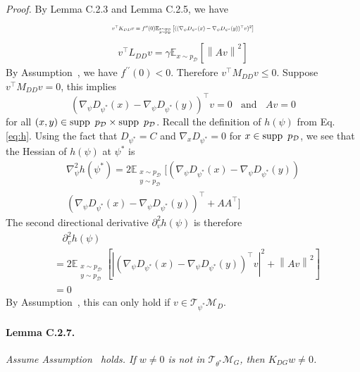 \emph{Proof.} By Lemma C.2.3 and Lemma C.2.5, we have
\begin{align}
\resizebox{0.42\textwidth}{!}{$
v^\top K_{DD}v=f^{\prime\prime}(0)\mathbb{E}_{\substack{x\sim p_\mathcal{D}\\y\sim p_\mathcal{D}}}\left[((\nabla_\psi D_{\psi^*}(x)-\nabla_\psi D_{\psi^*}(y))^\top v)^2\right]
$}
\end{align}
\begin{align}
v^\top L_{DD}v=\gamma\mathbb{E}_{x\sim p_\mathcal{D}}\left[\left\|Av\right \|^2\right]
\end{align}
By Assumption~, we have $f^{\prime\prime}(0)<0$. Therefore $v^\top M_{DD}v \leq 0$. Suppose $v^\top M_{DD}v=0$, this implies
\begin{equation}
(\nabla_\psi D_{\psi^*}(x)-\nabla_\psi D_{\psi^*}(y))^\top v=0\ \ \ \ \text{and}\ \ \ \ Av=0
\end{equation}
for all $(x,y)\in\supp\ p_\mathcal{D}\times\supp\ p_\mathcal{D}$. Recall the definition of $h(\psi)$ from Eq.\ref{eq:h}. Using the fact that $D_{\psi^*}=C$ and $\nabla_x D_{\psi^*}=0$ for $x\in\operatorname{supp}\ p_\mathcal{D}$, we see that the Hessian of $h(\psi)$ at $\psi^*$ is
\begin{align}
\nabla^2_\psi h(\psi^*)=2\mathbb{E}_{\substack{x\sim p_\mathcal{D}\\y\sim p_\mathcal{D}}}[(\nabla_\psi D_{\psi^*}(x)-\nabla_\psi D_{\psi^*}(y)) \nonumber \\
(\nabla_\psi D_{\psi^*}(x)-\nabla_\psi D_{\psi^*}(y))^\top+AA^\top]
\end{align}
The second directional derivative $\partial^2_v h(\psi)$ is therefore
\begin{align}
&\ \ \ \ \partial^2_v h(\psi) \nonumber \\
&=2\mathbb{E}_{\substack{x\sim p_\mathcal{D}\\y\sim p_\mathcal{D}}}\left[\left| (\nabla_\psi D_{\psi^*}(x)-\nabla_\psi D_{\psi^*}(y))^\top v\right|^2 + \left\|Av\right\|^2\right] \nonumber \\
&=0
\end{align}
By Assumption~, this can only hold if $v\in\mathcal{T}_{\psi^*}\mathcal{M}_D$.

\paragraph{Lemma C.2.7.} \emph{Assume Assumption~ holds. If $w\neq0$ is not in $\mathcal{T}_{\theta^*}\mathcal{M}_G$, then $K_{DG}w\neq0$.}

